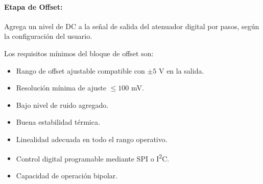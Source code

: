 

\paragraph{Etapa de Offset:} Agrega un nivel de DC a la señal de salida del atenuador digital por pasos, según la configuración del usuario.

Los requisitos mínimos del bloque de offset son:

\begin{itemize}[label=\textbullet]
	\item Rango de offset ajustable compatible con $\pm 5$ V en la salida.
	\item Resolución mínima de ajuste $\leq 100$ mV.
	\item Bajo nivel de ruido agregado.
	\item Buena estabilidad térmica.
	\item Linealidad adecuada en todo el rango operativo.
	\item Control digital programable mediante SPI o I\textsuperscript{2}C.
	\item Capacidad de operación bipolar.
\end{itemize}

